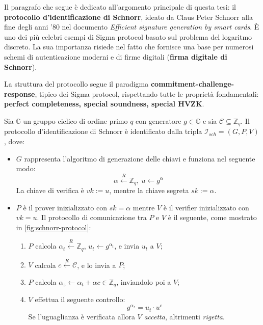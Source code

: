 Il paragrafo che segue è dedicato all'argomento principale di questa tesi: il \textbf{protocollo d'identificazione di Schnorr}, ideato da Claus Peter Schnorr alla fine degli anni '80 nel documento \textit{Efficient signature generation by smart cards}\cite{Schnorr2005}. È uno dei più celebri esempi di Sigma protocol basato sul problema del logaritmo discreto. La sua importanza risiede nel fatto che fornisce una base per numerosi schemi di autenticazione moderni e di firme digitali (\textbf{firma digitale di Schnorr}).

La struttura del protocollo segue il paradigma \textbf{commitment-challenge-response}, tipico dei Sigma protocol, rispettando tutte le proprietà fondamentali: \textbf{perfect completeness, special soundness, special HVZK}.

\begin{de}
	Sia $\mathbb{G}$ un gruppo ciclico di ordine primo $q$ con generatore $g \in \mathbb{G}$ e sia $\mathcal{C} \subseteq \mathbb{Z}_q$. Il protocollo d'identificazione di Schnorr è identificato dalla tripla $\mathcal{I}_{sch} = (G, P, V)$, dove:
	\begin{itemize}
		\item $G$ rappresenta l'algoritmo di generazione delle chiavi e funziona nel seguente modo:
		      $$\alpha \overset{R}{\leftarrow} \mathbb{Z}_q,\ u \leftarrow g^{\alpha}$$
		      La chiave di verifica è $vk := u$, mentre la chiave segreta $sk := \alpha$.
		\item $P$ è il prover inizializzato con $sk = \alpha$ mentre $V$ è il verifier inizializzato con $vk = u$. Il protocollo di comunicazione tra $P$ e $V$ è il seguente, come mostrato in \autoref{fig:schnorr-protocol}:
		      \begin{enumerate}
		      	\item $P$ calcola $\alpha_t \overset{R}{\leftarrow} \mathbb{Z}_q$, $u_t \leftarrow g^{\alpha_t}$, e invia $u_t$ a $V$;
		      	\item $V$ calcola $c \overset{R}{\leftarrow} \mathcal{C}$, e lo invia a $P$;
		      	\item $P$ calcola $\alpha_z \leftarrow \alpha_t + \alpha c \in \mathbb{Z}_q$, inviandolo poi a $V$;
		      	\item $V$ effettua il seguente controllo: $$g^{\alpha_z} = u_t \cdot u^c$$ Se l'uguaglianza è verificata allora $V$ \textit{accetta}, altrimenti \textit{rigetta}. 
		      \end{enumerate}
	\end{itemize}
\end{de}

